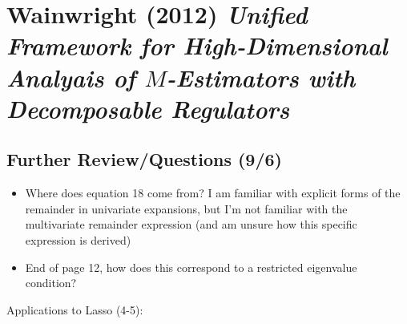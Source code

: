 \documentclass[11pt]{article}
\begin{document}
	
\newpage 

\section*{Wainwright (2012) {\large \it Unified Framework for High-Dimensional Analyais of $M$-Estimators with Decomposable Regulators}}

\subsection*{Further Review/Questions (9/6)}
\begin{itemize}
	\item{Where does equation 18 come from? I am familiar with explicit forms of the remainder in univariate expansions, but I'm not familiar with the multivariate remainder expression (and am unsure how this specific expression is derived)}
	\item End of page 12, how does this correspond to a restricted eigenvalue condition? 
\end{itemize}

Applications to Lasso (4-5):
\end{document}
